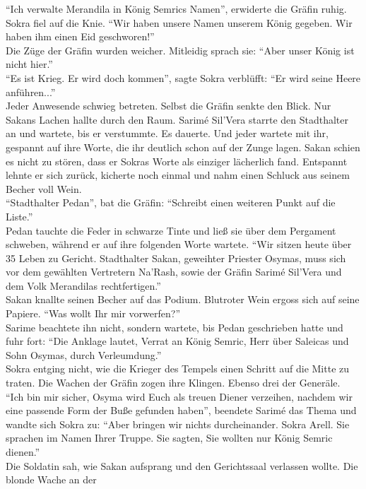 ``Ich verwalte Merandila in König Semrics Namen'', erwiderte die Gräfin ruhig.\\
Sokra fiel auf die Knie. ``Wir haben unsere Namen unserem König gegeben. Wir haben ihm einen Eid 
geschworen!''\\
Die Züge der Gräfin wurden weicher. Mitleidig sprach sie: ``Aber unser König ist nicht hier.''\\
``Es ist Krieg. Er wird doch kommen'', sagte Sokra verblüfft: ``Er wird seine Heere anführen...''\\
Jeder Anwesende schwieg betreten. Selbst die Gräfin senkte den Blick. Nur Sakans Lachen hallte 
durch den Raum. Sarimé Sil'Vera starrte den Stadthalter an und wartete, bis er verstummte. Es 
dauerte. Und jeder wartete mit ihr, gespannt auf ihre Worte, die ihr deutlich schon auf der Zunge 
lagen. Sakan schien es nicht zu stören, dass er Sokras Worte als einziger lächerlich fand. 
Entspannt lehnte er sich zurück, kicherte noch einmal und nahm einen Schluck aus seinem Becher voll 
Wein.\\
``Stadthalter Pedan'', bat die Gräfin: ``Schreibt einen weiteren Punkt auf die Liste.''\\
Pedan tauchte die Feder in schwarze Tinte und ließ sie über dem Pergament schweben, während er auf 
ihre folgenden Worte wartete. ``Wir sitzen heute über 35 Leben zu Gericht. Stadthalter Sakan, 
geweihter Priester Osymas, muss sich vor dem gewählten Vertretern Na'Rash, sowie der Gräfin Sarimé 
Sil'Vera und dem Volk Merandilas rechtfertigen.''\\
Sakan knallte seinen Becher auf das Podium. Blutroter Wein ergoss sich auf seine Papiere. ``Was 
wollt Ihr mir vorwerfen?''\\
Sarime beachtete ihn nicht, sondern wartete, bis Pedan geschrieben hatte und fuhr fort: ``Die 
Anklage lautet, Verrat an König Semric, Herr über Saleicas und Sohn Osymas, durch Verleumdung.''\\
Sokra entging nicht, wie die Krieger des Tempels einen Schritt auf die Mitte zu traten. Die Wachen 
der Gräfin zogen ihre Klingen. Ebenso drei der Generäle.\\
``Ich bin mir sicher, Osyma wird Euch als treuen Diener verzeihen, nachdem wir eine passende Form 
der Buße gefunden haben'', beendete Sarimé das Thema und wandte sich Sokra zu: ``Aber bringen wir 
nichts durcheinander. Sokra Arell. Sie sprachen im Namen Ihrer Truppe. Sie sagten, Sie wollten nur 
König Semric dienen.''\\
Die Soldatin sah, wie Sakan aufsprang und den Gerichtssaal verlassen wollte. Die blonde Wache an der 
